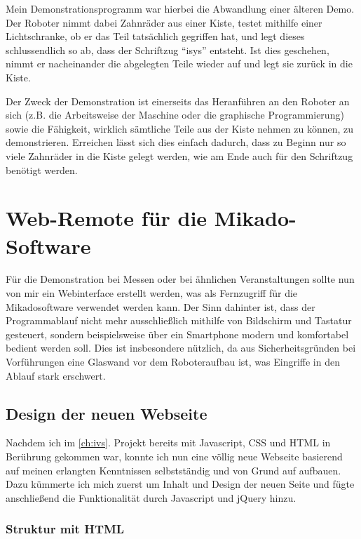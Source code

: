 Mein Demonstrationsprogramm war hierbei die Abwandlung einer älteren Demo. Der Roboter
nimmt dabei Zahnräder aus einer Kiste, testet mithilfe einer Lichtschranke, ob er
das Teil tatsächlich gegriffen hat, und legt dieses schlussendlich so ab, dass der
Schriftzug ``isys'' entsteht. Ist dies geschehen, nimmt er nacheinander die abgelegten
Teile wieder auf und legt sie zurück in die Kiste.

Der Zweck der Demonstration ist einerseits das Heranführen an den Roboter an sich
(z.B. die Arbeitsweise der Maschine oder die graphische Programmierung) sowie die
Fähigkeit, wirklich sämtliche Teile aus der Kiste nehmen zu können, zu demonstrieren.
Erreichen lässt sich dies einfach dadurch, dass zu Beginn nur so viele Zahnräder
in die Kiste gelegt werden, wie am Ende auch für den Schriftzug benötigt werden.



\section{Web-Remote für die Mikado-Software}
\label{sec:webtools-remote}

Für die Demonstration bei Messen oder bei ähnlichen Veranstaltungen sollte nun von
mir ein Webinterface erstellt werden, was als Fernzugriff für die Mikadosoftware
verwendet werden kann. Der Sinn dahinter ist, dass der Programmablauf nicht mehr
ausschließlich mithilfe von Bildschirm und Tastatur gesteuert, sondern beispielsweise
über ein Smartphone modern und komfortabel bedient werden soll. Dies ist insbesondere
nützlich, da aus Sicherheitsgründen bei Vorführungen eine Glaswand vor dem Roboteraufbau
ist, was Eingriffe in den Ablauf stark erschwert.


\subsection{Design der neuen Webseite}
\label{subsec:webtools-remote-design}

Nachdem ich im \ref{ch:ivs}. Projekt bereits mit Javascript, CSS und HTML in Berührung
gekommen war, konnte ich nun eine völlig neue Webseite basierend auf meinen erlangten
Kenntnissen selbstständig und von Grund auf aufbauen. Dazu kümmerte ich mich zuerst
um Inhalt und Design der neuen Seite und fügte anschließend die Funktionalität durch
Javascript und jQuery hinzu.

\subsubsection{Struktur mit HTML}
\label{subsubsec:webtools-remote-design-html}

